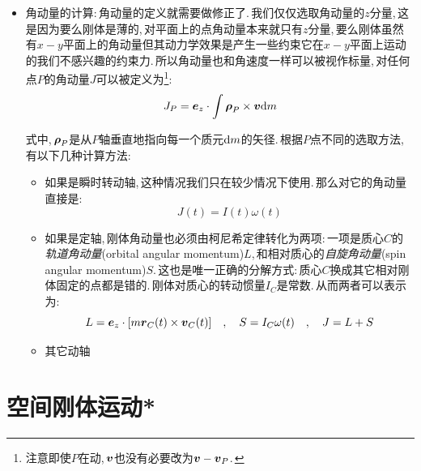 \begin{itemize}
\item 角动量的计算:\,角动量的定义就需要做修正了.\,我们仅仅选取角动量的$z$分量,\,这是因为要么刚体是薄的,\,对平面上的点角动量本来就只有$z$分量,\,要么刚体虽然有$x-y$平面上的角动量但其动力学效果是产生一些约束它在$x-y$平面上运动的我们不感兴趣的约束力.\,所以角动量也和角速度一样可以被视作标量,\,对任何点$P$的角动量$J$可以被定义为\footnote{注意即使$P$在动,\,$\boldsymbol{v}$也没有必要改为$\boldsymbol{v}-\boldsymbol{v}_P$.\,}:
\[J_P=\boldsymbol{e}_z\cdot \int \boldsymbol{\rho}_P\times \boldsymbol{v}\textrm{d} m\]

式中,\,$\boldsymbol{\rho}_P$是从$P$轴垂直地指向每一个质元$\textrm{d} m$的矢径.\,根据$P$点不同的选取方法,\,有以下几种计算方法:
\begin{itemize}
	\item 如果是瞬时转动轴,\,这种情况我们只在较少情况下使用.\,那么对它的角动量直接是:
	\[J(t)=I(t)\omega(t)\]

	\item 如果是定轴,\,刚体角动量也必须由柯尼希定律转化为两项:\,一项是质心$C$的\emph{轨道角动量}(orbital angular momentum)$L$,\,和相对质心的\emph{自旋角动量}(spin angular momentum)$S$.\,这也是唯一正确的分解方式:\,质心$C$换成其它相对刚体固定的点都是错的.\,刚体对质心的转动惯量$I_C$是常数.\,从而两者可以表示为:
	\[L=\boldsymbol{e}_z\cdot [m\boldsymbol{r}_C(t)\times \boldsymbol{v}_C(t)]\quad,\quad S=I_C\omega(t)\quad,\quad J=L+S\]
	
	\item 其它动轴
\end{itemize}
\end{itemize}
\section{空间刚体运动*}\label{6.3}


